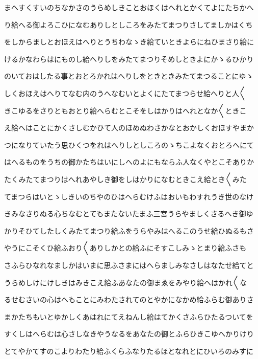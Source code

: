 \documentclass[a4paper,11pt,landscape]{ltjtarticle}
\begin{document}
\par\medskip
まへすくすいのちなかさのうらめしきことおほくはへれとかくてよにたちかへ
\par\medskip
り給へる御よろこひになむありしとしころをみたてまつりさしてましかはくち
\par\medskip
をしからましとおほえはへりとうちわなゝき給ていときよらにねひまさり給に
\par\medskip
けるかなわらはにものし給へりしをみたてまつりそめしときよにかゝるひかり
\par\medskip
のいておはしたる事とおとろかれはへりしをときときみたてまつることにゆゝ
\par\medskip
しくおほえはへりてなむ内のうへなむいとよくにたてまつらせ給へりと人〱
\par\medskip
きこゆるをさりともおとり給へらむとこそをしはかりはへれとなか〱ときこ
\par\medskip
え給へはことにかくさしむかひて人のほめぬわさかなとおかしくおほすやまか
\par\medskip
つになりていたう思ひくつをれはへりしとしころのゝちこよなくおとろへにて
\par\medskip
はへるものをうちの御かたちはいにしへのよにもならふ人なくやとこそありか
\par\medskip
たくみたてまつりはへれあやしき御をしはかりになむときこえ給とき〱みた
\par\medskip
てまつらはいとゝしきいのちやのひはへらむけふはおいもわすれうき世のなけ
\par\medskip
きみなさりぬる心ちなむとてもまたないたまふ三宮うらやましくさるへき御ゆ
\par\medskip
かりそひてしたしくみたてまつり給ふをうらやみはへるこのうせ給ひぬるもさ
\par\medskip
やうにこそくひ給ふおり〱ありしかとの給ふにそすこしみゝとまり給ふさも
\par\medskip
さふらひなれなましかはいまに思ふさまにはへらましみなさしはなたせ給てと
\par\medskip
うらめしけにけしきはみきこえ給ふあなたの御まゑをみやり給へはかれ〱な
\par\medskip
るせむさいの心はへもことにみわたされてのとやかになかめ給ふらむ御ありさ
\par\medskip
まかたちもいとゆかしくあはれにてえねんし給はてかくさふらひたるついてを
\par\medskip
すくしはへらむは心さしなきやうなるをあなたの御とふらひきこゆへかりけり
\par\medskip
とてやかてすのこよりわたり給ふくらふなりたるほとなれとにひいろのみすに
\par\medskip
\end{document}
